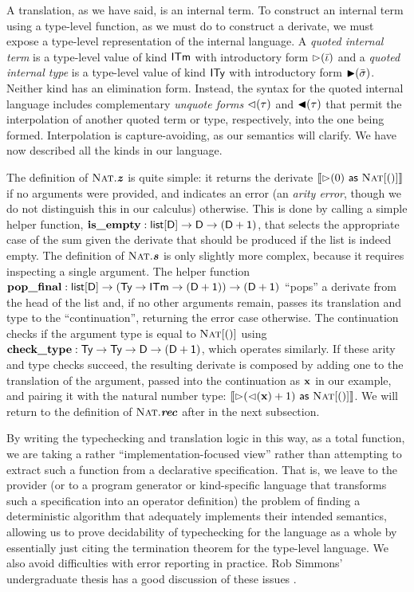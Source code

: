 \documentclass[9pt,preprint]{sigplanconf}
\begin{document}
A translation, as we have said, is an internal term. To construct an internal term using a type-level function, as we must do to construct a derivate, we must expose a type-level representation of the internal language. A \emph{quoted internal term} is a type-level value of kind $\textsf{ITm}$ with introductory form $\rhd(\bar \iota)$ and a \emph{quoted internal type} is a type-level value of kind $\textsf{ITy}$ with introductory form ${\blacktriangleright}(\bar \sigma)$. Neither kind has an elimination form. Instead, the syntax for the quoted  internal language includes complementary \emph{unquote forms} ${\lhd}(\tau)$ and ${\blacktriangleleft}(\tau)$ that permit the interpolation of another quoted term or type, respectively, into the one being formed. Interpolation is capture-avoiding, as our semantics will clarify. We have now described all the kinds in our language.

The definition of $\textsc{Nat}.\textbf{\textit{z}}$ is quite simple: it returns the derivate $\llbracket \rhd(0)~{\sf as}~\textsc{Nat}[()] \rrbracket$ if no arguments were provided, and indicates an error (an \emph{arity error}, though we do not distinguish this in our calculus) otherwise. This is done by calling a simple helper function, ${\textbf{is\_empty}} : \textsf{list}[\textsf{D}]\rightarrow{\textsf{D}\rightarrow{(\textsf{D}+ \textsf{1})}}$, that selects the appropriate case of the sum given the derivate that should be produced if the list is indeed empty. The definition of $\textsc{Nat}.\textbf{\textit{s}}$ is only slightly more complex, because it requires inspecting a single argument. The helper function ${\textbf{pop\_final}} : \textsf{list}[\textsf{D}]\rightarrow{(\textsf{Ty}\rightarrow{\textsf{ITm}\rightarrow{(\textsf{D}+ \textsf{1})})}}\rightarrow{(\textsf{D}+ \textsf{1})}$ ``pops'' a derivate from the head of the list and, if no other arguments remain, passes its translation and type to the ``continuation'', returning the error case otherwise. The continuation checks if the argument type is equal to $\textsc{Nat}[()]$ using ${\textbf{check\_type}} : \textsf{Ty}\rightarrow{\textsf{Ty}\rightarrow{\textsf{D}\rightarrow{(\textsf{D}+ \textsf{1})}}}$, which operates similarly. If these arity and type checks succeed, the resulting derivate is composed by adding one to the translation of the argument, passed into the continuation as ${\textbf{x}}$ in our example, and pairing it with the natural number type: $\llbracket \rhd({\lhd}({\textbf{x}}) + 1)~{\sf as}~\textsc{Nat}[()] \rrbracket$. We will return to the definition of $\textsc{Nat}.\textbf{\textit{rec}}$ after in the next subsection.

By writing the typechecking and translation logic in this way, as a total function, we are taking a rather ``implementation-focused view'' rather than attempting to extract such a function from a declarative specification. That is,  we leave to the provider (or to a program generator or kind-specific language that transforms such a specification into an operator definition) the problem of finding a deterministic algorithm that adequately implements their intended semantics, allowing us to prove decidability of typechecking for the language as a whole by essentially just citing the termination theorem for the type-level language. We also avoid difficulties with error reporting in practice. Rob Simmons' undergraduate thesis has a good discussion of these issues \cite{rjs-princeton}.
\end{document}
